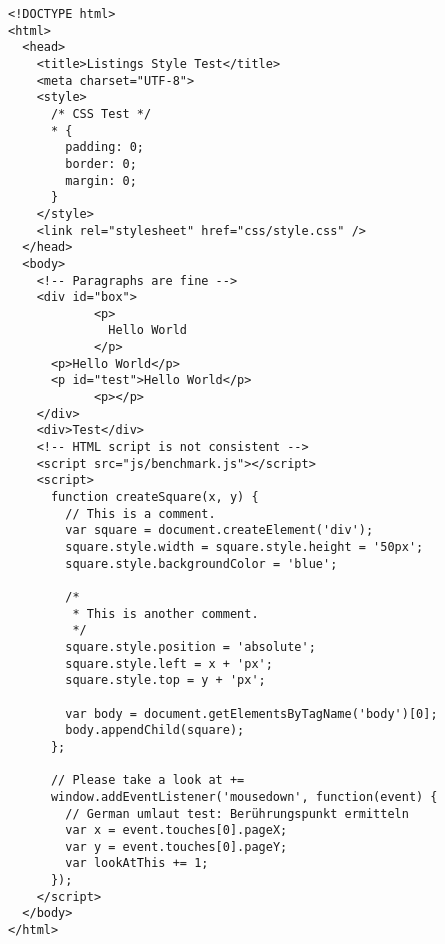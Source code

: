 \documentclass{scrreprt}
\begin{document}
\begin{lstlisting}
<!DOCTYPE html>
<html>
  <head>
    <title>Listings Style Test</title>
    <meta charset="UTF-8">
    <style>
      /* CSS Test */
      * {
        padding: 0;
        border: 0;
        margin: 0;
      }
    </style>
    <link rel="stylesheet" href="css/style.css" />
  </head>
  <body>
    <!-- Paragraphs are fine -->
    <div id="box">			
			<p>
			  Hello World
			</p>
      <p>Hello World</p>
      <p id="test">Hello World</p>
			<p></p>
    </div>
    <div>Test</div>
    <!-- HTML script is not consistent -->
    <script src="js/benchmark.js"></script>
    <script>
      function createSquare(x, y) {
        // This is a comment.
        var square = document.createElement('div');
        square.style.width = square.style.height = '50px';
        square.style.backgroundColor = 'blue';
        
        /*
         * This is another comment.
         */
        square.style.position = 'absolute';
        square.style.left = x + 'px'; 
        square.style.top = y + 'px';
        
        var body = document.getElementsByTagName('body')[0];
        body.appendChild(square);
      };
      
      // Please take a look at +=
      window.addEventListener('mousedown', function(event) {
        // German umlaut test: Berührungspunkt ermitteln
        var x = event.touches[0].pageX;
        var y = event.touches[0].pageY;
        var lookAtThis += 1;
      });
    </script>
  </body>
</html>
\end{lstlisting}
\end{document}
